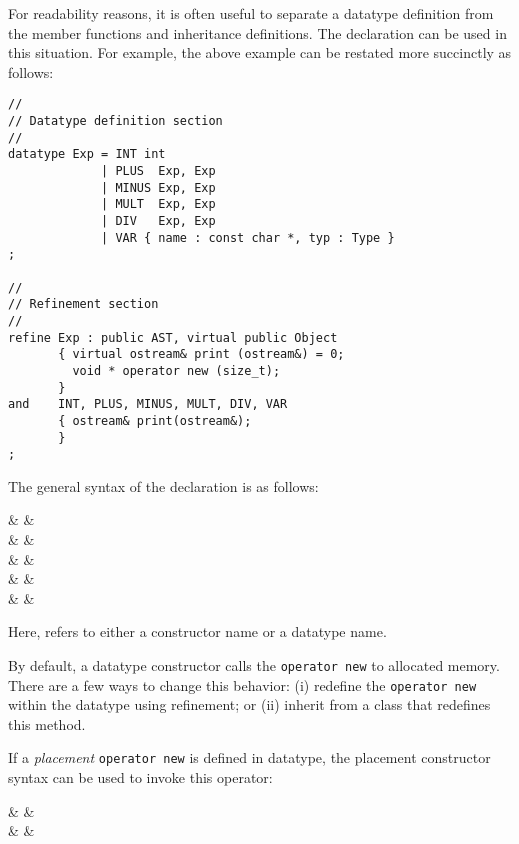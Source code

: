 For readability reasons, it is often useful to separate a datatype definition
from the member functions and inheritance definitions.   The 
declaration can be used in this situation.  For example, the above
example can be restated more succinctly as follows:

\begin{verbatim}
//
// Datatype definition section
//
datatype Exp = INT int        
             | PLUS  Exp, Exp 
             | MINUS Exp, Exp 
             | MULT  Exp, Exp 
             | DIV   Exp, Exp 
             | VAR { name : const char *, typ : Type }
;

//
// Refinement section
//
refine Exp : public AST, virtual public Object
       { virtual ostream& print (ostream&) = 0;
         void * operator new (size_t);
       }
and    INT, PLUS, MINUS, MULT, DIV, VAR
       { ostream& print(ostream&); 
       }
;
\end{verbatim}

The general syntax of the  declaration is as follows:
\begin{syntax}
   & \IS &   \T{;} \\
   & \IS &  \\
   &     & \quad {} \\
   &     & \quad {} \\
   &     & \quad {} \\
\end{syntax}
Here,  refers to either a constructor name or a datatype name.


   By default, a datatype constructor calls the \verb|operator new| to
allocated memory.  There are a few ways to change this behavior: (i)
redefine the \verb|operator new| within the datatype using refinement; or
(ii) inherit from a class that redefines this method.

   If a {\em placement} \verb|operator new| is defined in datatype,
the placement constructor syntax can be used to invoke this
operator:
\begin{syntax}
   & \IS &    \T{)} \T{(} 
    \T{)} \\
   & \OR &    \T{)} \T{\{} 
     \T{\}} \\
\end{syntax}

